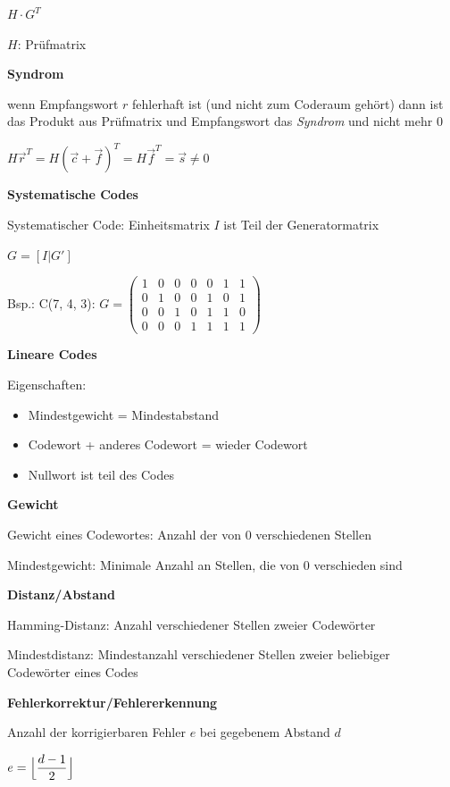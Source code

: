 $\displaystyle{
    H \cdot G^T
}$

$H$: Prüfmatrix

\textbf{Syndrom}

wenn Empfangswort $r$ fehlerhaft ist (und nicht zum Coderaum gehört) dann ist das Produkt aus
Prüfmatrix und Empfangswort das \textit{Syndrom} und nicht mehr 0

$\displaystyle{
    H \vec{r}^T = H (\vec{c} + \vec{f})^T = H \vec{f}^T = \vec{s} \neq 0
}$

\textbf{Systematische Codes}

Systematischer Code: Einheitsmatrix $I$ ist Teil der Generatormatrix

$\displaystyle{
    G = [I | G']
}$

Bsp.: C(7, 4, 3): 
$\displaystyle{
    G =
    \begin{pmatrix}
        1 & 0 & 0 & 0 & 0 & 1 & 1\\
        0 & 1 & 0 & 0 & 1 & 0 & 1\\
        0 & 0 & 1 & 0 & 1 & 1 & 0\\
        0 & 0 & 0 & 1 & 1 & 1 & 1
    \end{pmatrix}
}$

\textbf{Lineare Codes}

Eigenschaften:
\begin{itemize}
    \item Mindestgewicht = Mindestabstand
    \item Codewort + anderes Codewort = wieder Codewort
    \item Nullwort ist teil des Codes
\end{itemize}

\textbf{Gewicht}

Gewicht eines Codewortes: Anzahl der von 0 verschiedenen Stellen

Mindestgewicht: Minimale Anzahl an Stellen, die von 0 verschieden sind

\textbf{Distanz/Abstand}

Hamming-Distanz: Anzahl verschiedener Stellen zweier Codewörter

Mindestdistanz: Mindestanzahl verschiedener Stellen zweier beliebiger Codewörter eines Codes

\textbf{Fehlerkorrektur/Fehlererkennung}

Anzahl der korrigierbaren Fehler $e$ bei gegebenem Abstand $d$

$\displaystyle{
    e = \Bigl\lfloor \frac{d - 1}{2} \Bigr\rfloor
}$

